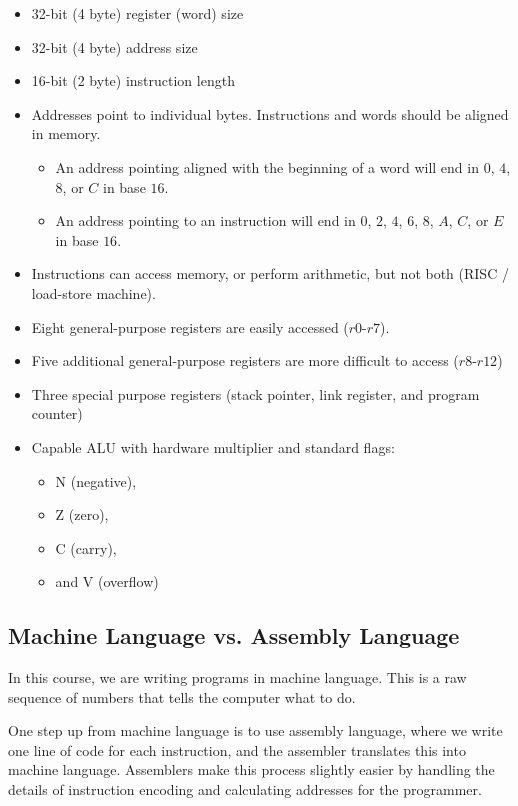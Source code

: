 \documentclass[12pt]{article}
\newcommand{\reg}[1]{$r#1$}
\begin{document}
\begin{itemize}
    \item 32-bit (4 byte) register (word) size
    \item 32-bit (4 byte) address size
    \item 16-bit (2 byte) instruction length
    \item {}Addresses point to individual bytes.  Instructions and words should be aligned in memory.
    \begin{itemize}
        \item An address pointing aligned with the beginning of a word will end in $0$, $4$, $8$, or $C$ in base $16$.
        \item An address pointing to an instruction will end in $0$, $2$, $4$, $6$, $8$, $A$, $C$, or $E$ in base $16$.
    \end{itemize}
    \item Instructions can access memory, or perform arithmetic, but not both (RISC / load-store machine).
    \item Eight general-purpose registers are easily accessed (\reg{0}-\reg{7}).
    \item Five additional general-purpose registers are more difficult to access (\reg{8}-\reg{12})
    \item Three special purpose registers (stack pointer, link register, and program counter)
    \item Capable ALU with hardware multiplier and standard flags:
    \begin{itemize}
        \item N (negative),
        \item Z (zero),
        \item C (carry),
        \item and V (overflow)
    \end{itemize}
\end{itemize}

\subsection{Machine Language vs. Assembly Language}

In this course, we are writing programs in machine language.  This is a raw sequence of numbers that tells the computer what to do.
\vspace{0.5cm}

One step up from machine language is to use assembly language, where we write one line of code for each instruction, and the assembler translates this into machine language.  Assemblers make this process slightly easier by handling the details of instruction encoding and calculating addresses for the programmer.
\end{document}

